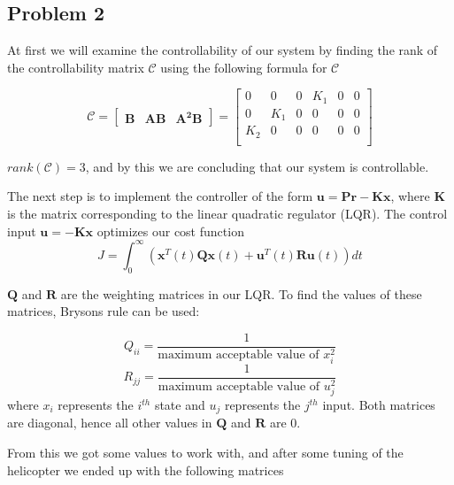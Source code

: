 \subsection{Problem 2}


At first we will examine the controllability of our system by finding the rank of the controllability matrix $\boldsymbol{\mathcal{C}}$ using the following formula for $\boldsymbol{\mathcal{C}}$

\begin{equation}
  \boldsymbol{\mathcal{C}} = \begin{bmatrix}
    \boldsymbol{B} & \boldsymbol{AB} & \boldsymbol{A^2B}
  \end{bmatrix}
  =
  \begin{bmatrix}
    0 & 0   & 0 & K_1 & 0 & 0\\
    0 & K_1 & 0 & 0   & 0 & 0\\
    K_2 & 0 & 0 & 0   & 0 & 0\\
  \end{bmatrix}
\end{equation}

 $rank(\bm{\mathcal{C}}) = 3$, and by this we are concluding that our system is controllable.

The next step is to implement the controller of the form $\bm{u = Pr-Kx}$, where $\bm{K}$ is the matrix corresponding to the linear quadratic regulator (LQR). The control input $\bm{u = -Kx}$ optimizes our cost function
\begin{equation}
    J = \int_{0}^{\infty} (\bm{x}^{T}(t)\bm{Qx}(t)+\bm{u}^{T}(t)\bm{Ru}(t)) dt
\end{equation}

$\bm{Q}$ and $\bm{R}$ are the weighting matrices in our LQR. To find the values of these matrices, Brysons rule can be used:

\begin{equation}
  Q_{ii} = \frac{1}{\text{maximum acceptable value of }x_i^2}
\end{equation}
\begin{equation}
  R_{jj} = \frac{1}{\text{maximum acceptable value of }u_j^2}
\end{equation}
where $x_i$ represents the $i^{th}$ state and $u_j$ represents the
$j^{th}$ input. Both matrices are diagonal, hence all other values in $\bm{Q}$ and $\bm{R}$ are 0. 

\newline
From this we got some values to work with, and after some tuning of the helicopter we ended up with the following matrices 

